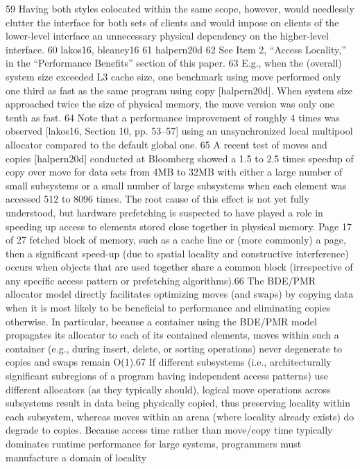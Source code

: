 59 Having both styles colocated within the same scope, however, would needlessly clutter the interface
for both sets of clients and would impose on clients of the lower-level interface an unnecessary
physical dependency on the higher-level interface.
60 lakos16, bleaney16
61 halpern20d
62 See Item 2, “Access Locality,” in the “Performance Benefits” section of this paper.
63 E.g., when the (overall) system size exceeded L3 cache size, one benchmark using move performed
only one third as fast as the same program using copy [halpern20d]. When system size approached
twice the size of physical memory, the move version was only one tenth as fast.
64 Note that a performance improvement of roughly 4 times was observed [lakos16, Section 10, pp.
53–57] using an unsynchronized local multipool allocator compared to the default global one.
65 A recent test of moves and copies [halpern20d] conducted at Bloomberg showed a 1.5 to 2.5 times
speedup of copy over move for data sets from 4MB to 32MB with either a large number of small
subsystems or a small number of large subsystems when each element was accessed 512 to 8096
times. The root cause of this effect is not yet fully understood, but hardware prefetching is suspected
to have played a role in speeding up access to elements stored close together in physical memory.
Page 17 of 27
fetched block of memory, such as a cache line or (more commonly) a page, then a
significant speed-up (due to spatial locality and constructive interference) occurs
when objects that are used together share a common block (irrespective of any
specific access pattern or prefetching algorithms).66
The BDE/PMR allocator model directly facilitates optimizing moves (and swaps) by
copying data when it is most likely to be beneficial to performance and eliminating
copies otherwise. In particular, because a container using the BDE/PMR model
propagates its allocator to each of its contained elements, moves within such a
container (e.g., during insert, delete, or sorting operations) never degenerate to
copies and swaps remain O(1).67 If different subsystems (i.e., architecturally
significant subregions of a program having independent access patterns) use
different allocators (as they typically should), logical move operations across
subsystems result in data being physically copied, thus preserving locality within
each subsystem, whereas moves within an arena (where locality already exists) do
degrade to copies.
Because access time rather than move/copy time typically dominates runtime
performance for large systems, programmers must manufacture a domain of locality
